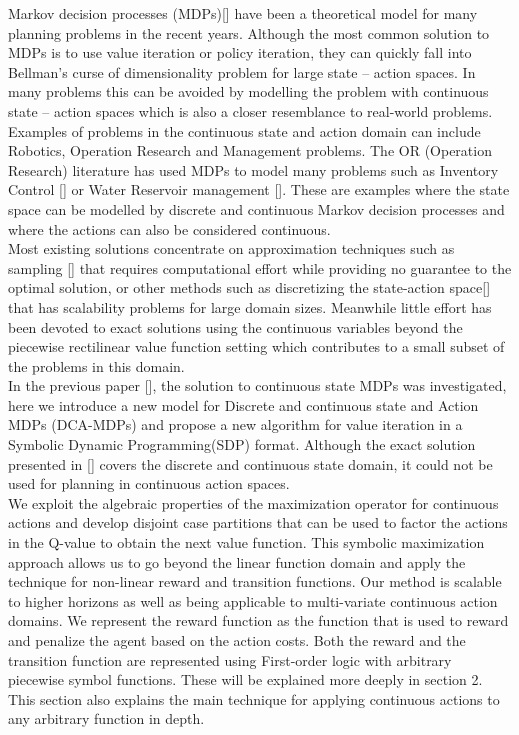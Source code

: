 \documentclass[letterpaper]{article}
\renewcommand{\-}{\text{-}}
\begin{document}
Markov decision processes (MDPs)[] have been a theoretical model for many planning problems in the recent years. Although the most common solution to MDPs is to use value iteration or policy iteration, they can quickly fall into Bellman's curse of dimensionality problem for large state – action spaces. In many problems this can be avoided by modelling the problem with continuous state – action spaces which is also a closer resemblance to real-world problems. \\
Examples of problems in the continuous state and action domain can include Robotics, Operation Research and Management problems. The OR (Operation Research) literature has used MDPs to model many problems such as Inventory Control [] or Water Reservoir management []. These are examples where the state space can be modelled by discrete and continuous Markov decision processes and where the actions can also be considered continuous. \\
Most existing solutions concentrate on approximation techniques such as sampling [] that requires computational effort while providing no guarantee to the optimal solution, or other methods such as discretizing the state-action space[] that has scalability problems for large domain sizes. Meanwhile little effort has been devoted to exact solutions using the continuous variables beyond the piecewise rectilinear value function setting which contributes to a small subset of the problems in this domain. \\
In the previous paper [], the solution to continuous state MDPs was investigated, here we introduce a new model for Discrete and continuous state and Action MDPs (DCA-MDPs) and propose a new algorithm for value iteration in a Symbolic Dynamic Programming(SDP) format. Although the exact solution presented in [] covers the discrete and continuous state domain, it could not be used for planning in continuous action spaces. \\
We exploit the algebraic properties of the maximization operator for continuous actions and develop disjoint case partitions that can be used to factor the actions in the Q-value to obtain the next value function. This symbolic maximization approach allows us to go beyond the linear function domain and apply the technique for non-linear reward and transition functions. Our method is scalable to higher horizons as well as being applicable to multi-variate continuous action domains. We represent the reward function as the function that is used to reward and penalize the agent based on the action costs. Both the reward and the transition function are represented using First-order logic with arbitrary piecewise symbol functions. These will be explained more deeply in section 2. This section also explains the main technique for applying continuous actions to any arbitrary function in depth. \\
\end{document}

